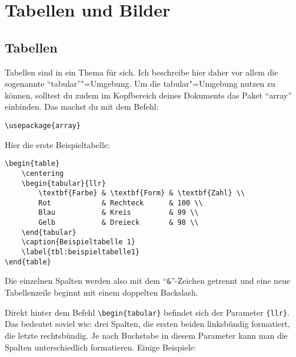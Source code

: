 %
%

\chapter{Tabellen und Bilder}
\label{sec:tabellenundbilder}

\section{Tabellen}

Tabellen sind in \DMLLaTeX{} ein Thema für sich. Ich beschreibe hier daher vor allem die sogenannte \enquote{tabular}"=Umgebung. Um die tabular"=Umgebung nutzen zu können, solltest du zudem im Kopfbereich deines Dokuments das Paket \enquote{array} einbinden. Das machst du mit dem Befehl:
\begin{lstlisting}
\usepackage{array}
\end{lstlisting}

Hier die erste Beispieltabelle:
\begin{lstlisting}
\begin{table}
	\centering
	\begin{tabular}{llr}
		\textbf{Farbe} & \textbf{Form} & \textbf{Zahl} \\
		Rot            & Rechteck      & 100 \\
		Blau           & Kreis         & 99 \\
		Gelb           & Dreieck       & 98 \\
	\end{tabular}
	\caption{Beispieltabelle 1}
	\label{tbl:beispieltabelle1}
\end{table}
\end{lstlisting}

Die einzelnen Spalten werden also mit dem \enquote{\texttt{\&}}-Zeichen getrennt und eine neue Tabellenzeile beginnt mit einem doppelten Backslash.

Direkt hinter dem Befehl \texttt{\textbackslash begin\{tabular\}} befindet sich der Parameter \texttt{\{llr\}}. Das bedeutet soviel wie: drei Spalten, die ersten beiden linksbündig formatiert, die letzte rechtsbündig. Je nach Buchstabe in diesem Parameter kann man die Spalten unterschiedlich formatieren. Einige Beispiele:

